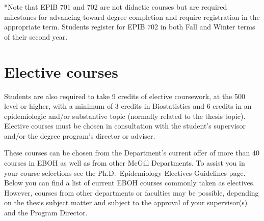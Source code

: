 \documentclass[
]{book}
\begin{document}
*Note that EPIB 701 and 702 are not didactic courses but are required milestones for advancing toward degree completion and require registration in the appropriate term. Students register for EPIB 702 in both Fall and Winter terms of their second year.

\hypertarget{elective-courses}{%
\section{Elective courses}\label{elective-courses}}

Students are also required to take 9 credits of elective coursework, at the 500 level or higher, with a minimum of 3 credits in Biostatistics and 6 credits in an epidemiologic and/or substantive topic (normally related to the thesis topic). Elective courses must be chosen in consultation with the student's supervisor and/or the degree program's director or adviser.

These courses can be chosen from the Department's current offer of more than 40 courses in EBOH as well as from other McGill Departments. To assist you in your course selections see the Ph.D.~Epidemiology Electives Guidelines page. Below you can find a list of current EBOH courses commonly taken as electives. However, courses from other departments or faculties may be possible, depending on the thesis subject matter and subject to the approval of your supervisor(s) and the Program Director.
\end{document}
